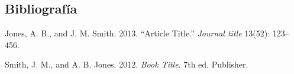 \documentclass[11pt]{article} %
\begin{document}
\subsection{Bibliografía}\label{biblioguxeda}
\vspace*{16pt}%
\setlength{\parindent}{-0.2in}
\small
\setlength{\leftskip}{0.2in}
\setlength{\parskip}{8pt}
\vspace*{-0.4in}
\noindent

\hypertarget{refs}{}
\hypertarget{ref-Smith:2013jd}{}
Jones, A. B., and J. M. Smith. 2013. ``Article Title.'' \emph{Journal
title} 13(52): 123--456.

\hypertarget{ref-Smith:2012qr}{}
Smith, J. M., and A. B. Jones. 2012. \emph{Book Title}. 7th ed.
Publisher.




\end{document}
